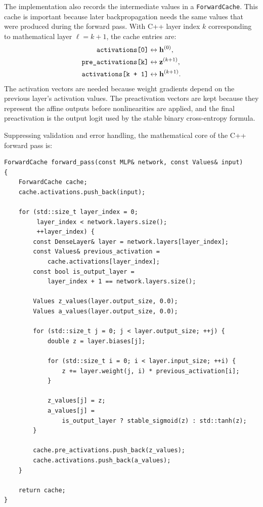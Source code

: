 \documentclass{article}
\begin{document}
The implementation also records the intermediate values in a
\texttt{ForwardCache}. This cache is important because later
backpropagation needs the same values that were produced during the
forward pass. With C++ layer index \(k\) corresponding to mathematical
layer \(\ell = k+1\), the cache entries are:
\[
\begin{aligned}
  \text{\texttt{activations[0]}}
  &\leftrightarrow \mathbf{h}^{(0)},\\
  \text{\texttt{pre\_activations[k]}}
  &\leftrightarrow \mathbf{z}^{(k+1)},\\
  \text{\texttt{activations[k + 1]}}
  &\leftrightarrow \mathbf{h}^{(k+1)}.
\end{aligned}
\]
The activation vectors are needed because weight gradients depend on
the previous layer's activation values. The preactivation vectors are
kept because they represent the affine outputs before nonlinearities
are applied, and the final preactivation is the output logit used by
the stable binary cross-entropy formula.

Suppressing validation and error handling, the mathematical core of the
C++ forward pass is:

\begin{verbatim}
ForwardCache forward_pass(const MLP& network, const Values& input)
{
    ForwardCache cache;
    cache.activations.push_back(input);

    for (std::size_t layer_index = 0;
         layer_index < network.layers.size();
         ++layer_index) {
        const DenseLayer& layer = network.layers[layer_index];
        const Values& previous_activation =
            cache.activations[layer_index];
        const bool is_output_layer =
            layer_index + 1 == network.layers.size();

        Values z_values(layer.output_size, 0.0);
        Values a_values(layer.output_size, 0.0);

        for (std::size_t j = 0; j < layer.output_size; ++j) {
            double z = layer.biases[j];

            for (std::size_t i = 0; i < layer.input_size; ++i) {
                z += layer.weight(j, i) * previous_activation[i];
            }

            z_values[j] = z;
            a_values[j] =
                is_output_layer ? stable_sigmoid(z) : std::tanh(z);
        }

        cache.pre_activations.push_back(z_values);
        cache.activations.push_back(a_values);
    }

    return cache;
}
\end{verbatim}
\end{document}
